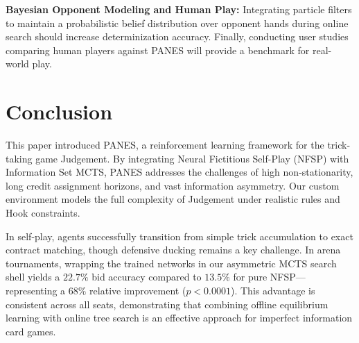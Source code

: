 \documentclass[conference]{IEEEtran}
\begin{document}
\textbf{Bayesian Opponent Modeling and Human Play:} Integrating particle filters to maintain a probabilistic belief distribution over opponent hands during online search should increase determinization accuracy. Finally, conducting user studies comparing human players against PANES will provide a benchmark for real-world play.

\section{\large \textbf{Conclusion}}

This paper introduced PANES, a reinforcement learning framework for the trick-taking game Judgement. By integrating Neural Fictitious Self-Play (NFSP) with Information Set MCTS, PANES addresses the challenges of high non-stationarity, long credit assignment horizons, and vast information asymmetry. Our custom environment models the full complexity of Judgement under realistic rules and Hook constraints.

In self-play, agents successfully transition from simple trick accumulation to exact contract matching, though defensive ducking remains a key challenge. In arena tournaments, wrapping the trained networks in our asymmetric MCTS search shell yields a $22.7\%$ bid accuracy compared to $13.5\%$ for pure NFSP—representing a $68\%$ relative improvement ($p < 0.0001$). This advantage is consistent across all seats, demonstrating that combining offline equilibrium learning with online tree search is an effective approach for imperfect information card games.



\end{document}
